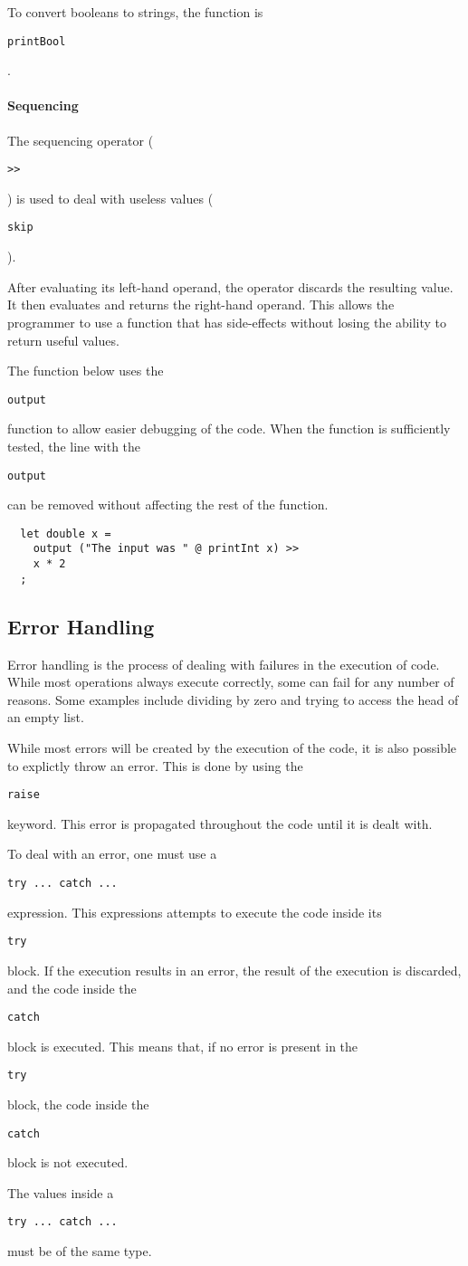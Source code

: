 \documentclass{article}
\def\code#1{\begin{footnotesize}\texttt{#1}\end{footnotesize}}
\begin{document}
To convert booleans to strings, the function is \code{printBool}.

\paragraph{Sequencing}

The sequencing operator (\code{>>}) is used to deal with useless values (\code{skip}).

After evaluating its left-hand operand, the operator discards the resulting value.
It then evaluates and returns the right-hand operand.
This allows the programmer to use a function that has side-effects without losing the ability to return useful values.

The function below uses the \code{output} function to allow easier debugging of the code.
When the function is sufficiently tested, the line with the \code{output} can be removed without affecting the rest of the function.

\begin{lstlisting}
  let double x =
    output ("The input was " @ printInt x) >>
    x * 2
  ;
\end{lstlisting}

\subsection{Error Handling}

Error handling is the process of dealing with failures in the execution of code.
While most operations always execute correctly, some can fail for any number of reasons.
Some examples include dividing by zero and trying to access the head of an empty list.

While most errors will be created by the execution of the code, it is also possible to explictly throw an error.
This is done by using the \code{raise} keyword.
This error is propagated throughout the code until it is dealt with.

To deal with an error, one must use a \code{try ... catch ...} expression.
This expressions attempts to execute the code inside its \code{try} block.
If the execution results in an error, the result of the execution is discarded, and the code inside the \code{catch} block is executed.
This means that, if no error is present in the \code{try} block, the code inside the \code{catch} block is not executed.

The values inside a \code{try ... catch ...} must be of the same type.
\end{document}
